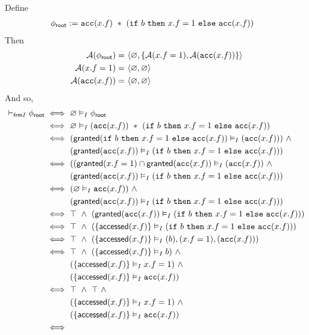 Define
\begin{align*}
{\phi_\textsf{root}} := & \
\texttt{acc}(x.f) \ \ast \
(\texttt{if} \ b \ \texttt{then} \ x.f = 1 \ \texttt{else} \ \texttt{acc}(x.f))
\end{align*}
Then
\begin{align*}
\mathcal{A}({\phi_\textsf{root}}) = & \
\langle \varnothing, \left\{  \mathcal{A}(x.f = 1), \mathcal{A}(\texttt{acc}(x.f))  \right\} \rangle \\
\mathcal{A}(x.f = 1) = & \ \langle \varnothing, \varnothing \rangle \\
\mathcal{A}(\texttt{acc}(x.f)) = & \ \langle \varnothing, \varnothing \rangle
\end{align*}
And so,
\begin{align*}
\selfframing \phiroot \iff & \
\empty \frames \phiroot
\\ \iff & \
\empty \frames (\cacc(x.f)) \ \ast \ (\cif \ b \ \cthen \ x.f = 1 \ \celse \ \cacc(x.f))
\\ \iff & \
( \granted(\cif \ b \ \cthen \ x.f = 1 \ \celse \ \cacc(x.f)) \frames (\cacc(x.f)) ) \ \land \\ & \
( \granted(\cacc(x.f)) \frames (\cif \ b \ \cthen \ x.f = 1 \ \celse \ \cacc(x.f)) )
\\ \iff & \
( ( \granted(x.f=1) \cap \granted(\cacc(x.f) ) \frames ( \cacc(x.f) ) \ \land \\ & \
( \granted(\cacc(x.f)) \frames (\cif \ b \ \cthen \ x.f = 1 \ \celse \ \cacc(x.f)) )
\\ \iff & \
( \empty \frames \cacc(x.f) ) \ \land \\ & \
( \granted(\cacc(x.f)) \frames (\cif \ b \ \cthen \ x.f = 1 \ \celse \ \cacc(x.f)) )
\\ \iff & \
\top \ \land \
( \granted(\cacc(x.f)) \frames (\cif \ b \ \cthen \ x.f = 1 \ \celse \ \cacc(x.f)) )
\\ \iff & \
\top \ \land \
( \set{ \accessed(x.f) } \frames (\cif \ b \ \cthen \ x.f = 1 \ \celse \ \cacc(x.f)) )
\\ \iff & \
\top \ \land \
( \set{ \accessed(x.f) } \frames (b), (x.f=1), (\cacc(x.f)) )
\\ \iff & \
\top \ \land \
(\set{ \accessed(x.f) } \frames b) \ \land \\ & \
(\set{ \accessed(x.f) } \frames x.f=1) \ \land \\ & \
(\set{ \accessed(x.f) } \frames \cacc(x.f))
\\ \iff & \
\top \ \land \
\top \ \land \\ & \
(\set{ \accessed(x.f) } \frames x.f=1) \ \land \\ & \
(\set{ \accessed(x.f) } \frames \cacc(x.f))
\\ \iff & \

\end{align*}
